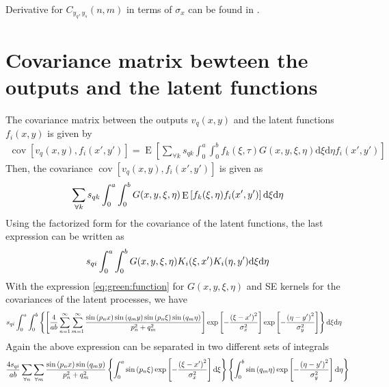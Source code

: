 \documentclass[a4paper,10pt]{article}
\newcommand{\dif}{\textrm{d}}
\DeclareMathOperator{\cov}{cov} \DeclareMathOperator{\ex}{E}
\begin{document}
Derivative for $C_{y_q,y_s}(n,m)$ in terms of $\sigma_x$ can be found
in \cite{Alvarez:HeatEquationReport}.

\section{Covariance matrix bewteen the outputs and the latent functions}

The covariance matrix between the outputs $v_q(x,y)$ and the latent
functions  $f_i(x,y)$
is given by
\begin{align}
\cov\left[v_q(x,y),f_i(x',y')\right]=\ex\left[\sum_{\forall
k}s_{qk}\int_0^a\int_0^bf_k(\xi,\tau)G(x, y, \xi, \eta)\dif\xi\dif\eta f_i(x',y')\right]
\end{align}
Then, the covariance $\cov\left[v_q(x,y),f_i(x',y')\right]$ is given
as
\begin{align}\notag
\sum_{\forall k}s_{qk}\int_0^a\int_0^bG(x,y, \xi,\eta)\ex\left[f_k(\xi,\eta)f_i(x',y')\right]
\dif\xi\dif\eta
\end{align}
Using the factorized form for the covariance of the latent functions, the last expression can be written as
\begin{align}\notag
s_{qi}\int_0^a\int_0^bG(x,y, \xi,\eta)K_i(\xi,x')K_i(\eta,y')
\dif\xi\dif\eta
\end{align}
With the expression \eqref{eq:green:function} for $G(x, y, \xi,\eta)$ and SE kernels for the
covariances of the latent processes, we have
\begin{align}\notag
\begin{split}
s_{qi}\int_0^a\int_0^b&\left\{\left[
\frac{4}{ab}\sum_{n=1}^\infty
                  \sum_{m=1}^\infty\frac{\sin\left({p_n x}\right)
\sin\left(q_m y\right)\sin\left(p_n \xi\right)\sin\left(q_m \eta\right)}{p_n^2 + q_m^2}\right]
\exp\left[-\frac{\left(\xi-x'\right)^2}{\sigma^2_x}\right]\exp\left[-\frac{\left(\eta-y'\right)^2}{\sigma^2_y}\right]\right\}\dif\xi\dif\eta
\end{split}
\end{align}
Again the above expression can be separated in
two different sets of integrals
\begin{align}\notag
\frac{4s_{qi}}{ab} \sum_{\forall n}\sum_{\forall m} \frac{\sin\left({p_n x}\right)
\sin\left(q_m y\right)}{p_n^2 + q_m^2}
\left\{\int_0^a\sin\left(p_n\xi\right)
\exp\left[-\frac{\left(\xi-x'\right)^2}{\sigma^2_x}\right]\dif\xi\right\}
\left\{\int_0^b\sin\left(q_m\eta\right)
\exp\left[-\frac{\left(\eta-y'\right)^2}{\sigma^2_y}\right]\dif\eta\right\}
\end{align}
\end{document}
